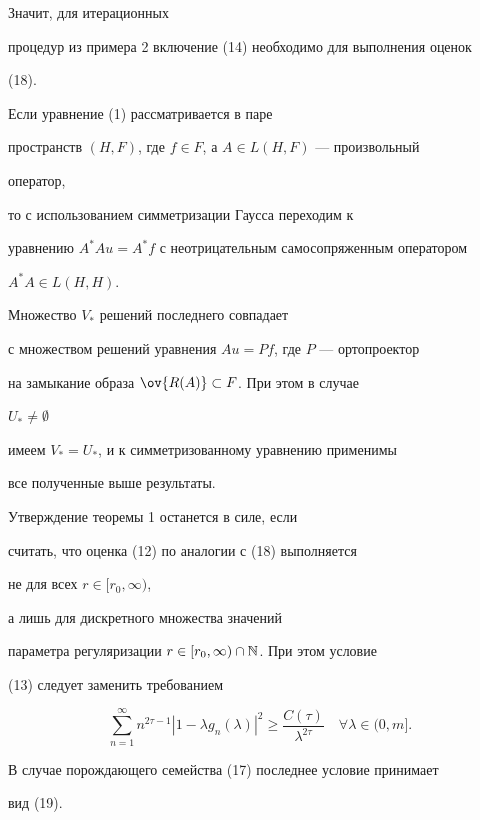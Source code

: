  


Значит, для итерационных 


процедур из примера 2 включение (14) необходимо для выполнения оценок 


(18). 


 


\begin{note} 


Если уравнение (1) рассматривается в паре 


пространств $(H,F)$, где $f\in F$, а $A\in L(H,F)$ --- произвольный 


оператор, 


то с использованием симметризации Гаусса переходим к 


уравнению $A^*Au=A^*f$ с неотрицательным самосопряженным оператором 


$A^*A\in L(H,H)$. 


Множество $V_*$ решений последнего совпадает 


с множеством решений уравнения $Au=Pf$, где $P$ --- ортопроектор 


на замыкание образа $\ov{R(A)}\subset F$. При этом в случае 


$U_*\ne\emptyset$ 


имеем $V_*=U_*$, и к симметризованному уравнению применимы 


все полученные выше результаты. 


\end{note} 


 


\begin{note} 


Утверждение теоремы 1 останется в силе, если 


считать, что оценка (12) по аналогии с (18) выполняется 


не для всех $r\in[r_0,\infty)$, 


а лишь для дискретного множества значений 


параметра регуляризации $r\in[r_0,\infty)\cap\Bbb N$. При этом условие 


(13) следует заменить требованием 


$$ 


\sum^\infty_{n=1}n^{2\tau-1}|1-\lambda g_n(\lambda)|^2\ge 


\frac{C(\tau)}{\lambda^{2\tau}}\quad\forall\lambda\in(0,m]. 


$$ 


В случае порождающего семейства (17) последнее условие принимает 


вид (19). 


\end{note} 


